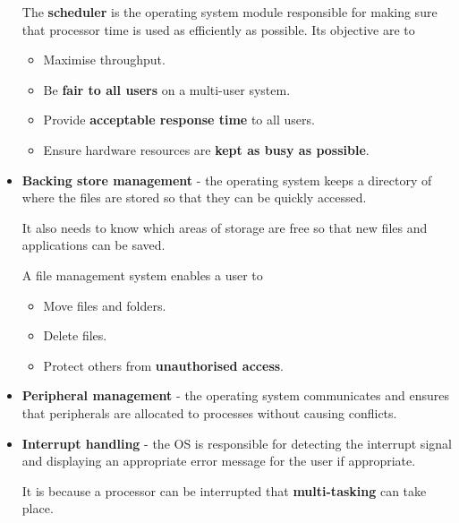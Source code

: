 \begin{itemize}
        The \textbf{scheduler} is the operating system module responsible for making sure that processor time is used as efficiently as possible. Its objective are to
        \begin{itemize}
            \item Maximise throughput.
            \item Be \textbf{fair to all users} on a multi-user system.
            \item Provide \textbf{acceptable response time} to all users.
            \item Ensure hardware resources are \textbf{kept as busy as possible}.
        \end{itemize}

    \item \textbf{Backing store management} - the operating system keeps a directory of where the files are stored so that they can be quickly accessed.

        It also needs to know which areas of storage are free so that new files and applications can be saved.

        A file management system enables a user to
        \begin{itemize}
            \item Move files and folders.
            \item Delete files.
            \item Protect others from \textbf{unauthorised access}.
        \end{itemize}

    \item \textbf{Peripheral management} - the operating system communicates and ensures that peripherals are allocated to processes without causing conflicts.

    \item \textbf{Interrupt handling} - the OS is responsible for detecting the interrupt signal and displaying an appropriate error message for the user if appropriate.

        It is because a processor can be interrupted that \textbf{multi-tasking} can take place.
\end{itemize}

